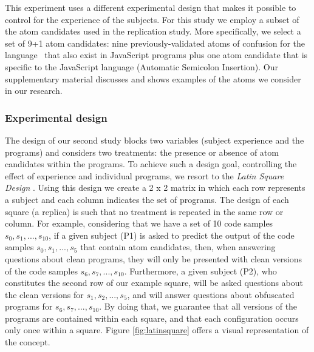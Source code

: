 This experiment uses a different experimental design that makes it possible to control for the experience of the subjects. For this study we employ a subset of the atom candidates used in the replication study. More specifically, we
select a set of 9+1 atom candidates: nine previously-validated atoms of confusion for the \clang language~\cite{DBLP:conf/sigsoft/GopsteinIYDZYC17} that also exist in JavaScript programs plus one atom candidate that is specific to the JavaScript language (Automatic Semicolon Insertion). 
Our supplementary material discusses and shows examples of the atoms we consider in our research.

\subsubsection*{Experimental design} 

The design of our second study blocks two variables (subject experience and the programs) and
considers two treatments: the presence or absence of atom candidates within the programs. 
To achieve such a design goal, controlling the effect of experience and individual programs, we resort to the \textit{Latin Square Design} \cite{Hunter-Experimenters}. Using this design we create a 2 x 2 matrix in which each row represents a subject and each column indicates the set of programs. The design of each square (a replica) is such that no treatment is repeated in the same row or column. For example, considering that we have a set of 10
code samples $s_0, s_1, ..., s_{10}$, if a given subject (P1) is asked to predict the output of the code samples $s_0, s_1, ..., s_5$ that contain atom candidates, then, when answering questions about clean programs, they will only be presented with clean versions of the code samples $s_6, s_7,..., s_{10}$. Furthermore, a given subject (P2), who constitutes the second row of our example square, will be asked questions about the clean versions for $s_1, s_2, ..., s_5$, and will answer questions about obfuscated programs for $s_6, s_7,..., s_{10}$. By doing that, we guarantee that all versions of the programs are contained within each square, and that each configuration occurs only once within a square. Figure \ref{fig:latinsquare} offers a visual representation of the concept.

